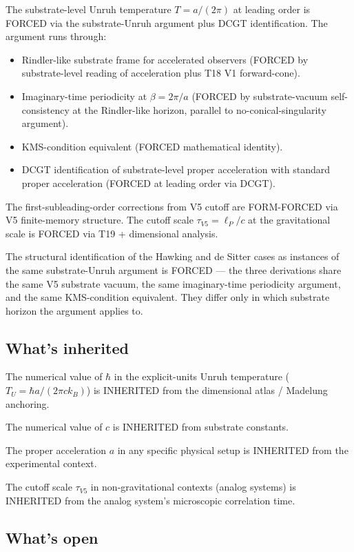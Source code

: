 \documentclass[11pt,a4paper]{article}
\begin{document}
The substrate-level Unruh temperature $T = a/(2\pi)$ at leading order is FORCED via the substrate-Unruh argument plus DCGT identification. The argument runs through:
\begin{itemize}[noitemsep]
\item Rindler-like substrate frame for accelerated observers (FORCED by substrate-level reading of acceleration plus T18 V1 forward-cone).
\item Imaginary-time periodicity at $\beta = 2\pi/a$ (FORCED by substrate-vacuum self-consistency at the Rindler-like horizon, parallel to no-conical-singularity argument).
\item KMS-condition equivalent (FORCED mathematical identity).
\item DCGT identification of substrate-level proper acceleration with standard proper acceleration (FORCED at leading order via DCGT).
\end{itemize}

The first-subleading-order corrections from V5 cutoff are FORM-FORCED via V5 finite-memory structure. The cutoff scale $\tau_{V5} = \ell_P/c$ at the gravitational scale is FORCED via T19 + dimensional analysis.

The structural identification of the Hawking and de Sitter cases as instances of the same substrate-Unruh argument is FORCED --- the three derivations share the same V5 substrate vacuum, the same imaginary-time periodicity argument, and the same KMS-condition equivalent. They differ only in which substrate horizon the argument applies to.

\subsection{What's inherited}

The numerical value of $\hbar$ in the explicit-units Unruh temperature ($T_U = \hbar a/(2\pi c k_B)$) is INHERITED from the dimensional atlas / Madelung anchoring.

The numerical value of $c$ is INHERITED from substrate constants.

The proper acceleration $a$ in any specific physical setup is INHERITED from the experimental context.

The cutoff scale $\tau_{V5}$ in non-gravitational contexts (analog systems) is INHERITED from the analog system's microscopic correlation time.

\subsection{What's open}
\end{document}
